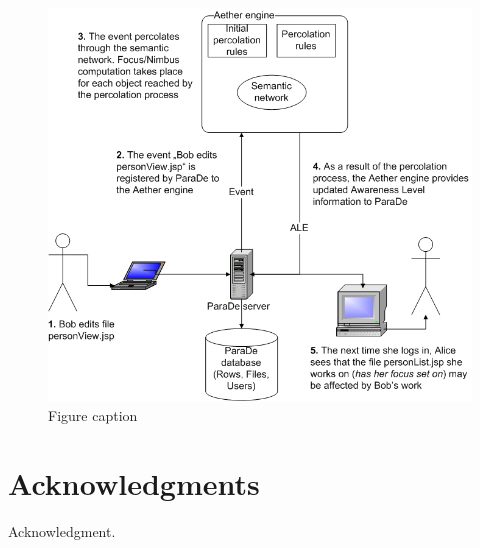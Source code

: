\documentclass{ecscw2007}
\begin{document}
\begin{figure}[htb]
  \centering
  \includegraphics[width=.7\linewidth]{figures/peroclation-example}
  \caption{Figure caption}
  \label{fig:figure3}
\end{figure}


\section*{Acknowledgments} 

{\footnotesize Acknowledgment. }




  
\end{document}
